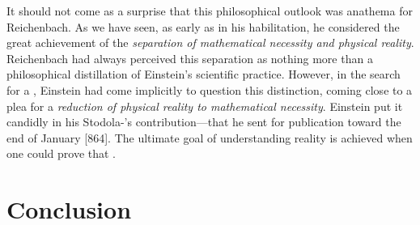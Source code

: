 \documentclass[draft]{article}
\begin{document}
It should not come as a surprise that this philosophical outlook was anathema for Reichenbach. As we have seen, as early as in his habilitation, he considered the great achievement of \rt the \emph{separation of mathematical necessity and physical reality}. Reichenbach had always perceived this separation as nothing more than a philosophical distillation of Einstein's scientific practice. However, in the search for a \uft, Einstein had come implicitly to question this distinction, coming close to a plea for a \emph{reduction of physical reality to mathematical necessity}. Einstein put it candidly in his Stodola-'s contribution---that he sent for publication toward the end of January [864]. The ultimate goal of understanding reality is achieved when one could prove that  \citep[127]{Einstein1929}.






\section{Conclusion}
\end{document}
